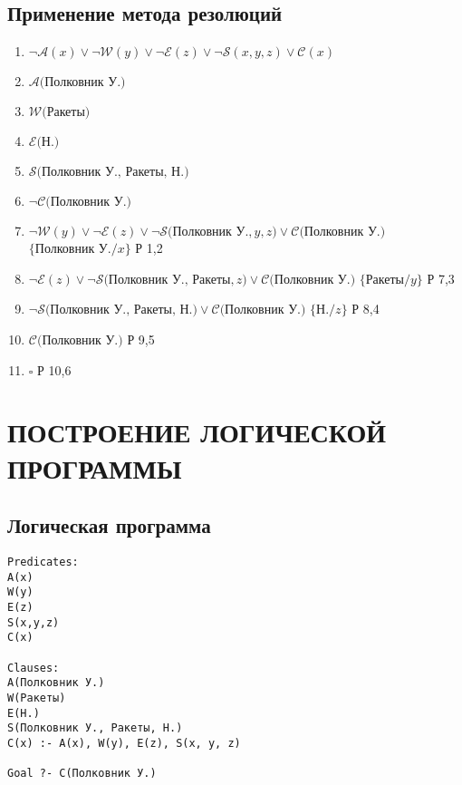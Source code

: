 \documentclass[titlepage,10pt,a4paper]{article}
\begin{document}
\subsection{Применение метода резолюций}
\begin{enumerate}
\item $\neg\mathcal{A}\left(x\right) \lor \neg\mathcal{W}\left(y\right) \lor \neg\mathcal{E}\left(z\right) \lor \neg\mathcal{S}\left(x, y, z\right) \lor \mathcal{C}\left(x\right)$
\item $\mathcal{A}\bigl(\text{Полковник У.}\bigr)$
\item $\mathcal{W}\bigl(\text{Ракеты}\bigr)$
\item $\mathcal{E}\bigl(\text{Н.}\bigr)$
\item $\mathcal{S}\bigl(\text{Полковник У., Ракеты, Н.}\bigr)$
\item $\neg\mathcal{C}\bigl(\text{Полковник У.}\bigr)$
\item $\neg\mathcal{W}\left(y\right) \lor \neg\mathcal{E}\left(z\right) \lor \neg\mathcal{S}\bigl(\text{Полковник У.}, y, z\bigr) \lor \mathcal{C}\bigl(\text{Полковник У.}\bigr)$ \hfill $\bigl\{\text{Полковник У.}/x\bigr\}$ \hfill Р 1,2
\item $\neg\mathcal{E}\left(z\right) \lor \neg\mathcal{S}\bigl(\text{Полковник У., Ракеты}, z\bigr) \lor \mathcal{C}\bigl(\text{Полковник У.}\bigr)$ \hfill $\bigl\{\text{Ракеты}/y\bigr\}$ \hfill Р 7,3
\item $\neg\mathcal{S}\bigl(\text{Полковник У., Ракеты, Н.}\bigr) \lor \mathcal{C}\bigl(\text{Полковник У.}\bigr)$ \hfill $\bigl\{\text{Н.}/z\bigr\}$ \hfill Р 8,4
\item $\mathcal{C}\bigl(\text{Полковник У.}\bigr)$ \hfill Р 9,5
\item $\square$ \hfill Р 10,6
\end{enumerate}

\newpage
\section{ПОСТРОЕНИЕ ЛОГИЧЕСКОЙ ПРОГРАММЫ}
\subsection{Логическая программа}
\begin{verbatim}
Predicates:
A(x)
W(y)
E(z)
S(x,y,z)
C(x)

Clauses:
A(Полковник У.)
W(Ракеты)
E(Н.)
S(Полковник У., Ракеты, Н.)
C(x) :- A(x), W(y), E(z), S(x, y, z)

Goal ?- C(Полковник У.)
\end{verbatim}
\end{document}
